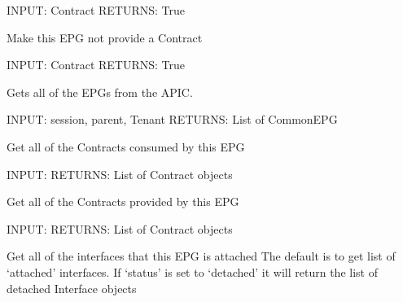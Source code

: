 \documentclass[letterpaper,10pt,english]{sphinxmanual}
\begin{document}
\begin{fulllineitems}
\begin{fulllineitems}
INPUT: Contract
RETURNS: True

\end{fulllineitems}


\begin{fulllineitems}
\label{acitoolkit:acitoolkit.CommonEPG.dont_provide}
Make this EPG not provide a Contract

INPUT: Contract
RETURNS: True

\end{fulllineitems}


\begin{fulllineitems}
\label{acitoolkit:acitoolkit.CommonEPG.get}
Gets all of the EPGs from the APIC.

INPUT: session, parent, Tenant
RETURNS: List of CommonEPG

\end{fulllineitems}


\begin{fulllineitems}
\label{acitoolkit:acitoolkit.CommonEPG.get_all_consumed}
Get all of the Contracts consumed by this EPG

INPUT:
RETURNS: List of Contract objects

\end{fulllineitems}


\begin{fulllineitems}
\label{acitoolkit:acitoolkit.CommonEPG.get_all_provided}
Get all of the Contracts provided by this EPG

INPUT:
RETURNS: List of Contract objects

\end{fulllineitems}


\begin{fulllineitems}
\label{acitoolkit:acitoolkit.CommonEPG.get_interfaces}
Get all of the interfaces that this EPG is attached
The default is to get list of `attached' interfaces.
If `status' is set to `detached' it will return the list of
detached Interface objects


\end{fulllineitems}
\end{fulllineitems}
\end{document}
